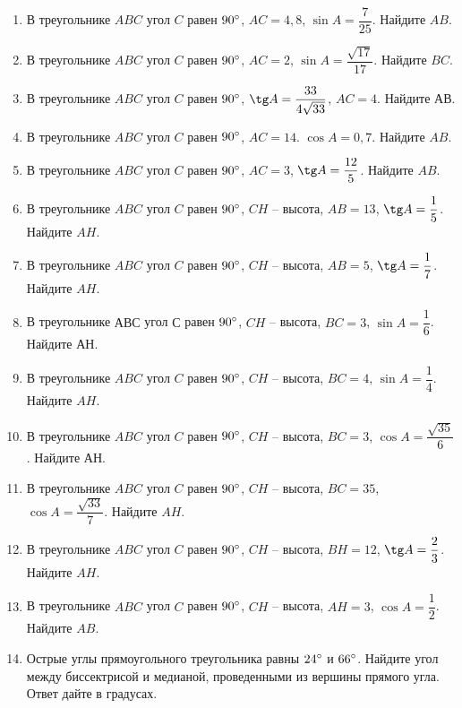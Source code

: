 \documentclass[12pt, a4paper]{article}
\begin{document}
\begin{enumerate}
		\item В треугольнике \( ABC \) угол \( C \) равен \( 90\degree \), \( AC=4,8 \),  \( \sin A=\dfrac{7}{25} \). Найдите \( AB \).
		\item В треугольнике \( ABC \) угол \( C \) равен \( 90 \degree \), \( AC=2 \),  \( \sin A=\dfrac{\sqrt{17}}{17} \). Найдите \( BC \).
		\item В треугольнике \( ABC \) угол \( C \) равен \( 90 \degree \), \( \tg A=\dfrac{33}{4\sqrt{33}} \), \( AC=4 \). Найдите \( АВ \).
		\item В треугольнике \( ABC \) угол \( C \) равен \( 90 \degree \), \( AC=14 \).  \( \cos A=0,7 \). Найдите \( AB \).
		\item В треугольнике \( ABC \) угол \( C \) равен \( 90\degree \), \( AC=3 \),  \( \tg A=\dfrac{12}{5} \). Найдите \( AB \).
		\item В треугольнике \( ABC \) угол \( C \) равен \( 90\degree \), \( CH \) – высота, \( AB=13 \),  \( \tg A=\dfrac{1}{5} \). Найдите \( AH \).
		\item В треугольнике \( ABC \) угол \( C \) равен \( 90 \degree \), \( CH \) – высота, \( AB=5 \),  \( \tg A=\dfrac{1}{7} \). Найдите \( AH \).
		\item В треугольнике \( АВС \) угол \( С \) равен \( 90 \degree \), \( CH \) – высота, \( BC=3 \),  \( \sin A=\dfrac{1}{6} \). Найдите \( АН \).
		\item В треугольнике \( ABC \) угол \( C \) равен \( 90 \degree \), \( CH \) – высота, \( BC=4 \),  \( \sin A = \dfrac{1}{4} \). Найдите \( AH \).
		\item В треугольнике \( ABC \) угол \( C \) равен \( 90 \degree \), \( CH \) – высота, \( BC=3 \),  \( \cos A =\dfrac{\sqrt{35}}{6} \). Найдите \( АН \).
		\item В треугольнике \( ABC \) угол \( C \) равен \( 90 \degree \), \( CH \) – высота, \( BC=35 \),  \( \cos A =\dfrac{\sqrt{33}}{7} \). Найдите \( AH \).
		\item В треугольнике \( ABC \) угол \( C \) равен \( 90\degree \), \( CH  \) – высота, \( BH = 12 \),  \( \tg A = \dfrac{2}{3} \). Найдите \( AH \).
		\item В треугольнике \( ABC \) угол \( C \) равен \( 90\degree \), \( CH  \) – высота, \(AH=3\),  \( \cos A = \dfrac{1}{2}\). Найдите \( AB \).
		\item Острые углы прямоугольного треугольника равны \( 24 \degree \) и \( 66 \degree \). Найдите угол между биссектрисой и медианой, проведенными из вершины прямого угла. Ответ дайте в градусах.

\end{enumerate}
\end{document}
